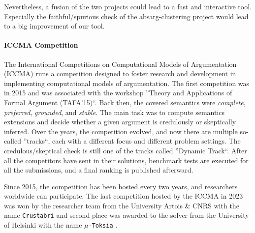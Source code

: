 Nevertheless, a fusion of the two projects could lead to a fast and interactive tool. Especially the faithful/spurious check of the absarg-clustering project would lead to a big improvement of our tool. 




\paragraph{ICCMA Competition} The International Competitions on Computational Models of Argumentation (ICCMA) runs a competition designed to foster research and development in implementing computational models of argumentation. The first competition was in 2015 and was associated with the workshop ''Theory and Applications of Formal Argument (TAFA'15)``. Back then, the covered semantics were \emph{complete}, \emph{preferred}, \emph{grounded}, and \emph{stable}. The main task was to compute semantics extensions and decide whether a given argument is credulously or skeptically inferred. Over the years, the competition evolved, and now there are multiple so-called ''tracks``, each with a different focus and different problem settings. The credulous/skeptical check is still one of the tracks called ''Dynamic Track``. After all the competitors have sent in their solutions, benchmark tests are executed for all the submissions, and a final ranking is published afterward.

Since 2015, the competition has been hosted every two years, and researchers worldwide can participate. The last competition hosted by the ICCMA in 2023 was won by the researcher team from the University Artois \& CNRS with the name \texttt{Crustabri} \cite{GitHub:repoWinnerICCMA2023} and second place was awarded to the solver from the University of Helsinki with the name \texttt{$\mu$-Toksia} \cite{DBLP:conf/kr/NiskanenJ20a}. 





